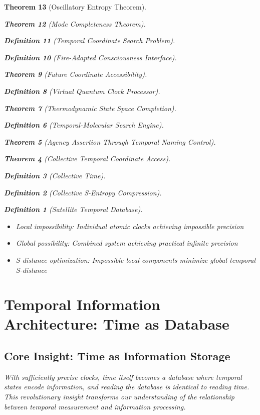 \documentclass[12pt,a4paper]{article}
\newtheorem{theorem}{Theorem}[section]
\newtheorem{definition}[theorem]{Definition}
\begin{document}
\begin{theorem}[Oscillatory Entropy Theorem]
\begin{theorem}[Mode Completeness Theorem]
\begin{enumerate}
\begin{definition}[Temporal Coordinate Search Problem]
\begin{algorithm}
\begin{definition}[Fire-Adapted Consciousness Interface]
\begin{theorem}[Future Coordinate Accessibility]
\begin{definition}[Virtual Quantum Clock Processor]
\begin{itemize}
\begin{itemize}
\begin{theorem}[Thermodynamic State Space Completion]
\begin{definition}[Temporal-Molecular Search Engine]
\begin{theorem}[Agency Assertion Through Temporal Naming Control]
\begin{remark}
\begin{theorem}[Collective Temporal Coordinate Access]
\begin{definition}[Collective Time]
\begin{definition}[Collective S-Entropy Compression]
\begin{definition}[Satellite Temporal Database]
\begin{algorithm}
\begin{table}[h]
{{\begin{itemize}
\item Local impossibility: Individual atomic clocks achieving impossible precision
\item Global possibility: Combined system achieving practical infinite precision
\item S-distance optimization: Impossible local components minimize global temporal S-distance
\end{itemize}

\section{Temporal Information Architecture: Time as Database}

\subsection{Core Insight: Time as Information Storage}

With sufficiently precise clocks, time itself becomes a database where temporal states encode information, and reading the database is identical to reading time. This revolutionary insight transforms our understanding of the relationship between temporal measurement and information processing.

\begin{figure}[H]
\centering
{}
\end{figure}}}
\end{table}
\end{algorithm}
\end{definition}
\end{definition}
\end{definition}
\end{theorem}
\end{remark}
\end{theorem}
\end{definition}
\end{theorem}
\end{itemize}
\end{itemize}
\end{definition}
\end{theorem}
\end{definition}
\end{algorithm}
\end{definition}
\end{enumerate}
\end{theorem}
\end{theorem}
\end{document}
